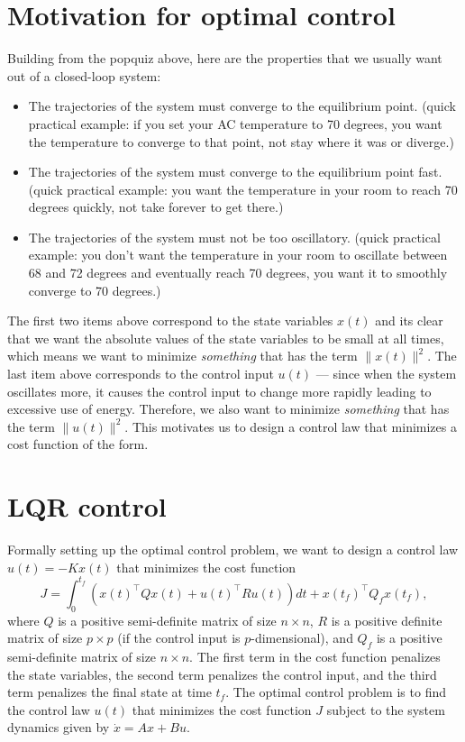 \documentclass{ee122_notes}
\begin{document}
\section{Motivation for optimal control}
Building from the popquiz above, here are the properties that we usually want out of a closed-loop system:
\begin{itemize}
    \item The trajectories of the system must converge to the equilibrium point. (quick practical example: if you set your AC temperature to 70 degrees, you want the temperature to converge to that point, not stay where it was or diverge.)
    \item The trajectories of the system must converge to the equilibrium point fast. (quick practical example: you want the temperature in your room to reach 70 degrees quickly, not take forever to get there.)
    \item The trajectories of the system must not be too oscillatory. (quick practical example: you don't want the temperature in your room to oscillate between 68 and 72 degrees and eventually reach 70 degrees, you want it to smoothly converge to 70 degrees.)
\end{itemize}
The first two items above correspond to the state variables $x(t)$ and its clear that we want the absolute values of the state variables to be small at all times, which means we want to minimize \textit{something} that has the term $\| x(t) \|^2$. The last item above corresponds to the control input $u(t)$ --- since when the system oscillates more, it causes the control input to change more rapidly leading to excessive use of energy. Therefore, we also want to minimize \textit{something} that has the term $\| u(t) \|^2$. This motivates us to design a control law that minimizes a cost function of the form.
\section{LQR control}
Formally setting up the optimal control problem, we want to design a control law $u(t) = -Kx(t)$ that minimizes the cost function
\begin{equation}
    J = \int_0^{t_f} \left( x(t)^\top Q x(t) + u(t)^\top R u(t) \right) dt + x(t_f)^\top Q_f x(t_f),
    \label{eq:lqr_cost}
\end{equation}
where $Q$ is a positive semi-definite matrix of size $n \times n$, $R$ is a positive definite matrix of size $p \times p$ (if the control input is $p$-dimensional), and $Q_f$ is a positive semi-definite matrix of size $n \times n$. The first term in the cost function penalizes the state variables, the second term penalizes the control input, and the third term penalizes the final state at time $t_f$. The optimal control problem is to find the control law $u(t)$ that minimizes the cost function $J$ subject to the system dynamics given by $\dot{x} = Ax + Bu$.
\end{document}
